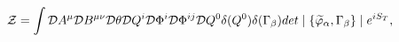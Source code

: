 \begin{equation}\label{generating-ftn}
{\cal Z}=\int {\cal D}A^\mu {\cal D}B^{\mu\nu} {\cal D}\theta
{\cal D}Q^i {\cal D}\Phi^i {\cal D}\Phi^{ij}{\cal D}Q^0
\delta(Q^0)\delta(\Gamma_\beta)
det\mid\{\widetilde{\varphi}_\alpha, \Gamma_\beta \}\mid e^{iS_T},
\end{equation}

